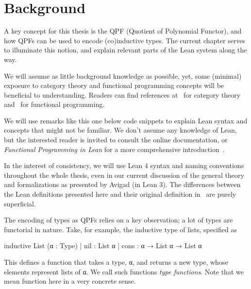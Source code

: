 \chapter{Background}%
\label{ch:background}

A key concept for this thesis is the QPF (Quotient of Polynomial Functor), and how QPFs can be used to encode (co)inductive types. The current chapter serves to illuminate this notion, and explain relevant parts of the Lean system along the way.

We will assume as little background knowledge as possible, yet, some (minimal) exposure to category theory and functional programming concepts will be beneficial to understanding. Readers can find references at~\cite{awodeyCategoryTheory2010, milewskiCategoryTheoryProgrammers} for category theory and~\cite{christiansenFunctionalProgrammingLean} for functional programming.


\begin{remark}
    We will use remarks like this one below code snippets to explain Lean syntax and concepts that might not be familiar. We don't assume any knowledge of Lean, but the interested reader is invited to consult the online documentation, or \emph{Functional Programming in Lean} for a more comprehensive introduction~\cite{avigadTheoremProvingLean,christiansenFunctionalProgrammingLean}.
\end{remark}

In the interest of consistency, we will use Lean 4 syntax and naming conventions throughout the whole thesis,
even in our current discussion of the general theory and formalizations as presented by Avigad \etal{} (in Lean 3).
The differences between the Lean definitions presented here and their original definition in~\cite{avigadDataTypesQuotients2019a} are purely superficial.



The encoding of types as QPFs relies on a key observation; a lot of types are functorial in nature.
Take, for example, the inductive type of lists, specified as
\begin{leancode}
  inductive List (α : Type)
    | nil  : List α
    | cons : α → List α → List α
\end{leancode}

This defines a function  that takes a type, α, and returns a new type, whose elements represent lists of α.
We call such functions \emph{type functions}. Note that we mean function here in a very concrete sense.

